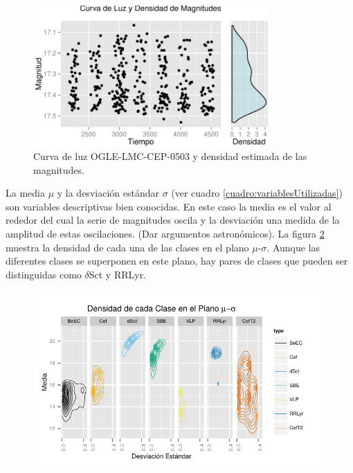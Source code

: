 \documentclass[letterpaper,12pt]{book}
\begin{document}
\begin{figure}
  \centering
  \includegraphics[width = 0.8\textwidth]{./img/CClasificacion/curvaHist.pdf}
  \caption{Curva de luz OGLE-LMC-CEP-0503 y densidad estimada de las magnitudes. }
  \label{fig:curvaHist}
  \centering
\end{figure}

La media $\mu$ y la desviación estándar $\sigma$ (ver cuadro \ref{cuadro:variablesUtilizadas}) son variables descriptivas bien conocidas. En este caso la media es el valor al rededor del cual la serie de magnitudes oscila y la desviación una medida de la amplitud de estas oscilaciones. (Dar argumentos astronómicos). La figura \ref{fig:mediaDesv} muestra la densidad de cada una de las clases en el plano $\mu$-$\sigma$. Aunque las diferentes clases se superponen en este plano, hay pares de clases que pueden ser distinguidas como $\delta$Sct y RRLyr.

\begin{figure}
  \centering
  \includegraphics[width = \textwidth]{./img/CClasificacion/mediaDesv.pdf}
  \caption{}
  \label{fig:mediaDesv}
  \centering
\end{figure}
\end{document}
